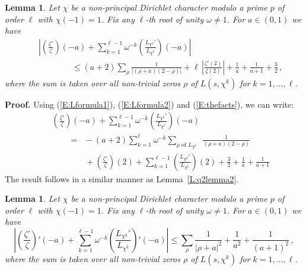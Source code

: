\documentclass{amsart}
\newtheorem{lemma}[theorem]{Lemma}
\numberwithin{equation}{section}
\numberwithin{table}{section}
\begin{document}
\begin{lemma}\label{L:rlemma2}
Let $\chi$ be a non-principal Dirichlet character modulo a prime $p$ of order $\ell$ with $\chi(-1)=1$.
Fix any $\ell$-th root of unity $\omega\neq 1$.
For $a\in(0,1)$ we have
\begin{eqnarray*}
   &&
    \left|
  \left(\frac{\zeta'}{\zeta}\right)(-a)
  +
   \sum_{k=1}^{\ell-1}
  \omega^{-k}
  \left(\frac{L_{\chi^k}'}{L_{\chi^k}}\right)(-a)
  \right|
  \\[1ex]
  &&
  \qquad\qquad
  \leq
  (a+2)
  \sum_\rho
  
  \frac{1}{|(\rho+a)(2-\rho)|}
  +
  \ell\,
  \left|\frac{\zeta'(2)}{\zeta(2)}\right|
  +
  \frac{1}{a}
  +
  \frac{1}{a+1}
  +
  \frac{3}{2}
  \,,
\end{eqnarray*} 
where the sum is taken over all non-trivial zeros $\rho$ of $L(s,\chi^k)$ for $k=1,\dots,\ell$. 
\end{lemma}

\noindent\textbf{Proof.}
Using
(\ref{E:Lformula1}), (\ref{E:Lformula2}) and (\ref{E:thefacts}),
we can write:
\begin{eqnarray*}
  &&
  \left(\frac{\zeta'}{\zeta}\right)(-a)
  +
   \sum_{k=1}^{\ell-1}
  \omega^{-k}
  \left(\frac{L_{\chi^k}'}{L_{\chi^k}}\right)(-a)
  \\
  &&
  \qquad
  =\;\;
    -(a+2)
     \sum_{k=1}^\ell
     \omega^{-k}
     \sum_{\rho\text{ of $L_{\chi^k}$ }}
     
     \frac{1}{(\rho+a)(2-\rho)}
   \\
   &&
   \qquad\qquad
     +
     \left(\frac{\zeta'}{\zeta}\right)(2)
    +
    \sum_{k=1}^{\ell-1}
      \left(\frac{L_{\chi^k}'}{L_{\chi^k}}\right)(2)
     +
     \frac{3}{2} 
     +
     \frac{1}{a}
     +
     \frac{1}{a+1}
\end{eqnarray*}
The result follows in a similar manner as Lemma~\ref{L:q2lemma2}.
{\raisebox{-.25ex}{\scalebox{.786}[1.272]{$\blacksquare$}}}

\begin{lemma}\label{L:rlemma4}
Let $\chi$ be a non-principal Dirichlet character modulo a prime $p$ of order $\ell$ with $\chi(-1)=1$.
Fix any $\ell$-th root of unity $\omega\neq 1$.
For $a\in(0,1)$ we have
$$
 \left|
  \left(\frac{\zeta'}{\zeta}\right)'(-a)
  +
   \sum_{k=1}^{\ell-1}
 \omega^{-k}
 \left(
 \frac{L_{\chi^k}'}{L_{\chi^k}}
 \right)'
 (-a)
 \right|
 \leq
 \sum_{\rho}
 \frac{1}{|\rho+a|^2}
 +
 \frac{1}{a^2}
 +
 \frac{1}{(a+1)^2}
 \,,
$$
where the sum is taken over all non-trivial zeros $\rho$ of $L(s,\chi^k)$ for $k=1,\dots,\ell$. 
\end{lemma}
\end{document}
